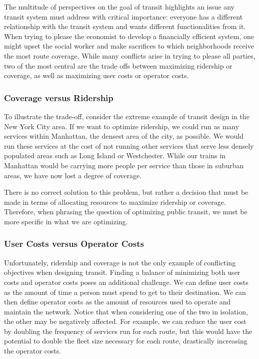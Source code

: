 \documentclass[11pt]{amsart}
\theoremstyle{definition}                  %
\theoremstyle{remark}                       %
\numberwithin{equation}{section}
\begin{document}
    The multitude of perspectives on the goal of transit highlights an issue any transit system must address with critical importance: everyone has a different relationship with the transit system and wants different functionalities from it. When trying to please the economist to develop a financially efficient system, one might upset the social worker and make sacrifices to which neighborhoods receive the most route coverage. While many conflicts arise in trying to please all parties, two of the most central are the trade offs between maximizing ridership or coverage, as well as maximizing user costs or operator costs. 

    \subsubsection{Coverage versus Ridership}
    To illustrate the trade-off, consider the extreme example of transit design in the New York City area. If we want to optimize ridership, we could run as many services within Manhattan, the densest area of the city, as possible. We would run these services at the cost of not running other services that serve less densely populated areas such as Long Island or Westchester. While our trains in Manhattan would be carrying more people per service than those in suburban areas, we have now lost a degree of coverage.

    There is no correct solution to this problem, but rather a decision that must be made in terms of allocating resources to maximize ridership or coverage. Therefore, when phrasing the question of optimizing public transit, we must be more specific in what we are optimizing. 

    \subsubsection{User Costs versus Operator Costs}
    Unfortunately, ridership and coverage is not the only example of conflicting objectives when designing transit. Finding a balance of minimizing both user costs and operator costs poses an additional challenge. We can define user costs as the amount of time a person must spend to get to their destination. We can then define operator costs as the amount of resources used to operate and maintain the network. Notice that when considering one of the two in isolation, the other may be negatively affected. For example, we can reduce the user cost by doubling the frequency of services run for each route, but this would have the potential to double the fleet size necessary for each route, drastically increasing the operator costs. 
\end{document}

